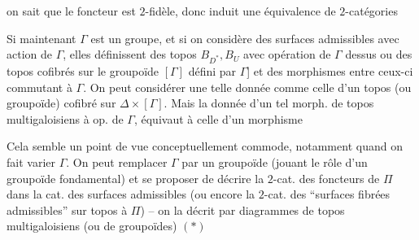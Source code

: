 on sait que le foncteur est $2$-fidèle, donc induit une équivalence de $2$-catégories

Si maintenant $\Gamma$ est un groupe, et si on considère des surfaces admissibles avec action de $\Gamma$, elles définissent des topos  $B_{D^*},B_U$ avec opération de $\Gamma$ dessus \unsure{[|(}ou des topos cofibrés sur le groupoïde $[\Gamma]$ défini par $\Gamma$] et des morphismes entre ceux-ci commutant à $\Gamma$. On peut considérer une telle donnée comme celle d'un topos  (ou groupoïde) cofibré sur $\Delta\times[\Gamma]$.   Mais la donnée d'un tel morph. de topos multigaloisiens à op. de $\Gamma$, équivaut à celle d'un morphisme 

Cela semble un point de vue conceptuellement commode, notamment quand on fait varier $\Gamma$. On peut remplacer $\Gamma$ par un groupoïde  \inserted{$\Pi$} (jouant le rôle d'un groupoïde fondamental) et se proposer de décrire la $2$-cat.  des foncteurs de $\Pi$ dans la cat. des surfaces admissibles (ou encore la $2$-cat. des ``surfaces fibrées admissibles'' sur  topos    à $\Pi$) -- on la décrit par   diagrammes de topos multigaloisiens (ou de groupoïdes)
$(*)$

